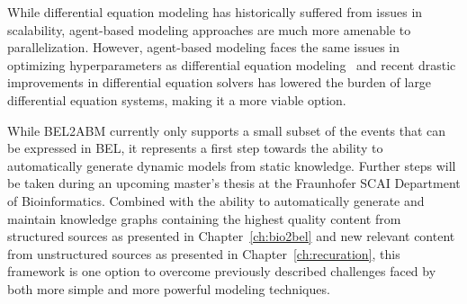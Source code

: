 While differential equation modeling has historically suffered from issues in scalability, agent-based modeling approaches are much more amenable to parallelization.
However, agent-based modeling faces the same issues in optimizing hyperparameters as differential equation modeling~\cite{Stapor2018} and recent drastic improvements in differential equation solvers has lowered the burden of large differential equation systems, making it a more viable option.

While BEL2ABM currently only supports a small subset of the events that can be expressed in \ac{BEL}, it represents a first step towards the ability to automatically generate dynamic models from static knowledge.
Further steps will be taken during an upcoming master's thesis at the Fraunhofer SCAI Department of Bioinformatics.
Combined with the ability to automatically generate and maintain knowledge graphs containing the highest quality content from structured sources as presented in Chapter~\ref{ch:bio2bel} and new relevant content from unstructured sources as presented in Chapter~\ref{ch:recuration}, this framework is one option to overcome previously described challenges faced by both more simple and more powerful modeling techniques.
